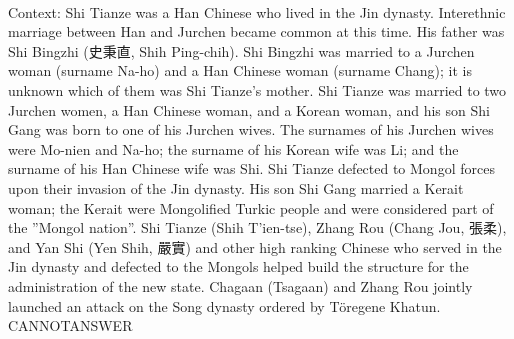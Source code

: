 \documentclass[11pt,a4paper, onecolumn]{article}
\begin{document}
\\ Context: Shi Tianze was a Han Chinese who lived in the Jin dynasty. Interethnic marriage between Han and Jurchen became common at this time. His father was Shi Bingzhi (史秉直, Shih Ping-chih). Shi Bingzhi was married to a Jurchen woman (surname Na-ho) and a Han Chinese woman (surname Chang); it is unknown which of them was Shi Tianze's mother. Shi Tianze was married to two Jurchen women, a Han Chinese woman, and a Korean woman, and his son Shi Gang was born to one of his Jurchen wives. The surnames of his Jurchen wives were Mo-nien and Na-ho; the surname of his Korean wife was Li; and the surname of his Han Chinese wife was Shi. Shi Tianze defected to Mongol forces upon their invasion of the Jin dynasty. His son Shi Gang married a Kerait woman; the Kerait were Mongolified Turkic people and were considered part of the ''Mongol nation''. Shi Tianze (Shih T'ien-tse), Zhang Rou (Chang Jou, 張柔), and Yan Shi (Yen Shih, 嚴實) and other high ranking Chinese who served in the Jin dynasty and defected to the Mongols helped build the structure for the administration of the new state. Chagaan (Tsagaan) and Zhang Rou jointly launched an attack on the Song dynasty ordered by Töregene Khatun. CANNOTANSWER
\end{document}
